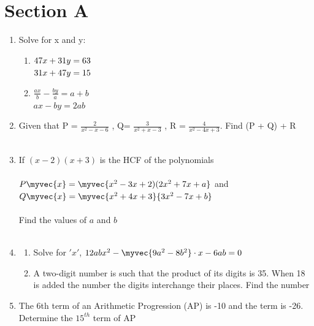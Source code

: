 \documentclass[journal,12pt,twocolumn]{IEEEtran}
\renewcommand\thesection{\arabic{section}}
\begin{document}
\section{Section A}
\renewcommand{\theequation}{\theenumi}
\begin{enumerate}[label=\thesection.\arabic*.,ref=\thesection.\theenumi]
\item Solve for x and y: \\ 
\begin{enumerate}
    \item $47x + 31y = 63\\$\\
    $31x + 47y = 15\\$\\
    \item $\frac{ax}{b}  - \frac{by}{a}  = a+b$\\
    $ ax - by = 2ab $\\
\end{enumerate}
\item Given that P = $\frac{2}{x^2-x-6}$ , Q= $\frac{3}{x^2+x-3}$ , R = $\frac{4}{x^2-4x+3}$. Find (P + Q) + R\\
\vspace{5mm}\\
\item If $ (x-2)(x+3) $ is the HCF of the polynomials\\
\vspace{2mm}\\
$ P\myvec{x} = \myvec{x^2 - 3x + 2)(2x^2 + 7x + a}$  and\\
$ Q\myvec{x} = \myvec{x^2 + 4x + 3}{3x^2 - 7x + b}$\\
\vspace{2mm}\\
Find the values of $a$ and $b$\\
\vspace{5mm}\\
\item \begin{enumerate}
    \item Solve for $'x'$, $ 12abx^2 - \myvec{9a^2 - 8b^2} \cdot x - 6ab = 0 $\\
    \item A two-digit number is such that the product of its digits is 35. When 18 is added the number the digits interchange their places. Find the number\\
\end{enumerate}
\item The 6th term of an Arithmetic Progression (AP) is -10 and the term is -26. Determine the $15^{th}$ term of AP\\

\end{enumerate}
\end{document}
